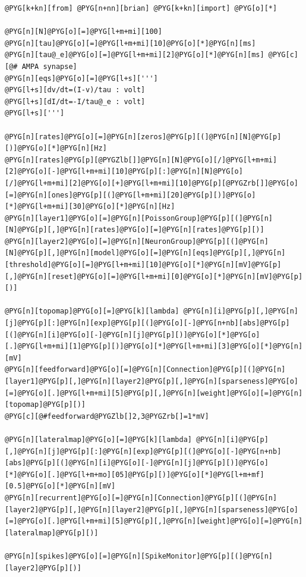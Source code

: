 \documentclass[letterpaper,10pt,english]{manual}
\begin{document}
\begin{Verbatim}[commandchars=@\[\]]
@PYG[k+kn][from] @PYG[n+nn][brian] @PYG[k+kn][import] @PYG[o][*]

@PYG[n][N]@PYG[o][=]@PYG[l+m+mi][100]
@PYG[n][tau]@PYG[o][=]@PYG[l+m+mi][10]@PYG[o][*]@PYG[n][ms]
@PYG[n][tau@_e]@PYG[o][=]@PYG[l+m+mi][2]@PYG[o][*]@PYG[n][ms] @PYG[c][@# AMPA synapse]
@PYG[n][eqs]@PYG[o][=]@PYG[l+s][''']
@PYG[l+s][dv/dt=(I-v)/tau : volt]
@PYG[l+s][dI/dt=-I/tau@_e : volt]
@PYG[l+s][''']

@PYG[n][rates]@PYG[o][=]@PYG[n][zeros]@PYG[p][(]@PYG[n][N]@PYG[p][)]@PYG[o][*]@PYG[n][Hz]
@PYG[n][rates]@PYG[p][@PYGZlb[]]@PYG[n][N]@PYG[o][/]@PYG[l+m+mi][2]@PYG[o][-]@PYG[l+m+mi][10]@PYG[p][:]@PYG[n][N]@PYG[o][/]@PYG[l+m+mi][2]@PYG[o][+]@PYG[l+m+mi][10]@PYG[p][@PYGZrb[]]@PYG[o][=]@PYG[n][ones]@PYG[p][(]@PYG[l+m+mi][20]@PYG[p][)]@PYG[o][*]@PYG[l+m+mi][30]@PYG[o][*]@PYG[n][Hz]
@PYG[n][layer1]@PYG[o][=]@PYG[n][PoissonGroup]@PYG[p][(]@PYG[n][N]@PYG[p][,]@PYG[n][rates]@PYG[o][=]@PYG[n][rates]@PYG[p][)]
@PYG[n][layer2]@PYG[o][=]@PYG[n][NeuronGroup]@PYG[p][(]@PYG[n][N]@PYG[p][,]@PYG[n][model]@PYG[o][=]@PYG[n][eqs]@PYG[p][,]@PYG[n][threshold]@PYG[o][=]@PYG[l+m+mi][10]@PYG[o][*]@PYG[n][mV]@PYG[p][,]@PYG[n][reset]@PYG[o][=]@PYG[l+m+mi][0]@PYG[o][*]@PYG[n][mV]@PYG[p][)]

@PYG[n][topomap]@PYG[o][=]@PYG[k][lambda] @PYG[n][i]@PYG[p][,]@PYG[n][j]@PYG[p][:]@PYG[n][exp]@PYG[p][(]@PYG[o][-]@PYG[n+nb][abs]@PYG[p][(]@PYG[n][i]@PYG[o][-]@PYG[n][j]@PYG[p][)]@PYG[o][*]@PYG[o][.]@PYG[l+m+mi][1]@PYG[p][)]@PYG[o][*]@PYG[l+m+mi][3]@PYG[o][*]@PYG[n][mV]
@PYG[n][feedforward]@PYG[o][=]@PYG[n][Connection]@PYG[p][(]@PYG[n][layer1]@PYG[p][,]@PYG[n][layer2]@PYG[p][,]@PYG[n][sparseness]@PYG[o][=]@PYG[o][.]@PYG[l+m+mi][5]@PYG[p][,]@PYG[n][weight]@PYG[o][=]@PYG[n][topomap]@PYG[p][)]
@PYG[c][@#feedforward@PYGZlb[]2,3@PYGZrb[]=1*mV]

@PYG[n][lateralmap]@PYG[o][=]@PYG[k][lambda] @PYG[n][i]@PYG[p][,]@PYG[n][j]@PYG[p][:]@PYG[n][exp]@PYG[p][(]@PYG[o][-]@PYG[n+nb][abs]@PYG[p][(]@PYG[n][i]@PYG[o][-]@PYG[n][j]@PYG[p][)]@PYG[o][*]@PYG[o][.]@PYG[l+m+mo][05]@PYG[p][)]@PYG[o][*]@PYG[l+m+mf][0.5]@PYG[o][*]@PYG[n][mV]
@PYG[n][recurrent]@PYG[o][=]@PYG[n][Connection]@PYG[p][(]@PYG[n][layer2]@PYG[p][,]@PYG[n][layer2]@PYG[p][,]@PYG[n][sparseness]@PYG[o][=]@PYG[o][.]@PYG[l+m+mi][5]@PYG[p][,]@PYG[n][weight]@PYG[o][=]@PYG[n][lateralmap]@PYG[p][)]

@PYG[n][spikes]@PYG[o][=]@PYG[n][SpikeMonitor]@PYG[p][(]@PYG[n][layer2]@PYG[p][)]


\end{Verbatim}
\end{document}
